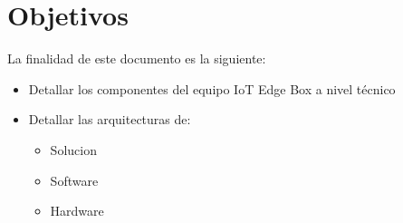 \renewcommand{\sectionTitle}{Objetivos}
\section{\sectionTitle}
\label{sec:section1}

La finalidad de este documento es la siguiente:

\begin{itemize}
  \item Detallar los componentes del equipo IoT Edge Box a nivel técnico
  \item Detallar las arquitecturas de:
  \begin{itemize}
    \item Solucion
    \item Software
    \item Hardware
  \end{itemize}
\end{itemize}

